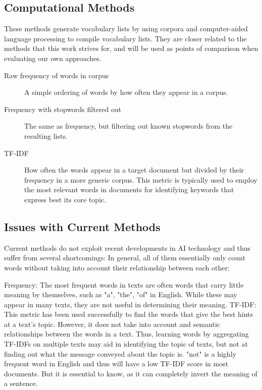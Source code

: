 \subsection{Computational Methods}
These methods generate vocabulary lists by using corpora and computer-aided language processing to compile vocabulary lists.
They are closer related to the methods that this work strives for, and will be used as points of comparison when evaluating our own approaches.

\begin{description}
	\item [Raw frequency of words in corpus]
	      A simple ordering of words by how often they appear in a corpus.
	\item [Frequency with stopwords filtered out]
	      The same as frequency, but filtering out known stopwords from the resulting lists.
	\item [TF-IDF]
	      How often the words appear in a target document but divided by their frequency in a more generic corpus.
	      This metric is typically used to employ the most relevant words in documents for identifying keywords that express best its core topic.
\end{description}

\subsection{Issues with Current Methods}
Current methods do not exploit recent developments in AI technology and thus suffer from several shortcomings:
In general, all of them essentially only count words without taking into account their relationship between each other:

Frequency: The most frequent words in texts are often words that carry little meaning by themselves, such as "a", "the", "of" in English.
While these may appear in many texts, they are not useful in determining their meaning.
TF-IDF: This metric has been used successfully to find the words that give the best hints at a text's topic.
However, it does not take into account and semantic relationships between the words in a text.
Thus, learning words by aggregating TF-IDFs on multiple texts may aid in identifying the topic of texts, but not at finding out what the message conveyed about the topic is.
"not" is a highly frequent word in English and thus will have a low TF-IDF score in most documents. But it is essential to know, as it can completely invert the meaning of a sentence.


